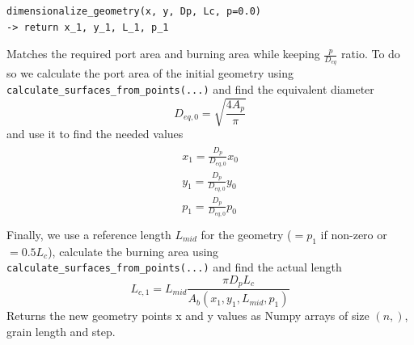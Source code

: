 \begin{verbatim}
dimensionalize_geometry(x, y, Dp, Lc, p=0.0)
-> return x_1, y_1, L_1, p_1
\end{verbatim}
\hspace*{2em} Matches the required port area and burning area while keeping $\frac{p}{D_{eq}}$ ratio. To do so we calculate the port area of the initial geometry using \verb|calculate_surfaces_from_points(...)| and find the equivalent diameter
\begin{equation}
    D_{eq,0}=\sqrt{\frac{4A_p}{\pi}}
\end{equation}
and use it to find the needed values
\begin{gather}
    \begin{matrix}
        x_1=\frac{D_p}{D_{eq,0}}x_0\\
        y_1=\frac{D_p}{D_{eq,0}}y_0\\
        p_1=\frac{D_p}{D_{eq,0}}p_0\\
    \end{matrix}
\end{gather}
Finally, we use a reference length $L_{mid}$ for the geometry ($=p_1$ if non-zero or $=0.5L_c$), calculate the burning area using \verb|calculate_surfaces_from_points(...)| and find the actual length
\begin{equation}
    L_{c,1}=L_{mid}\frac{\pi D_pL_c}{A_b(x_1,y_1,L_{mid},p_1)}
\end{equation}
Returns the new geometry points x and y values as Numpy arrays of size $(n,)$, grain length and step.



